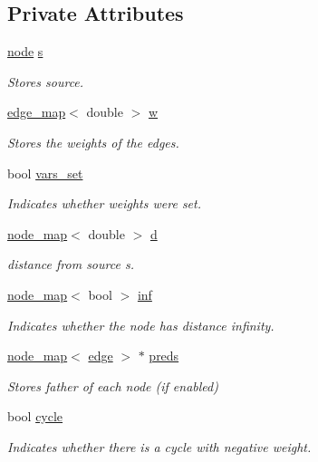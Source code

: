 \subsection*{Private Attributes}
\begin{DoxyCompactItemize}
\item 
\mbox{\hyperlink{classnode}{node}} \mbox{\hyperlink{classbellman__ford_a2d6ce715e65b26822c622b322811c3b0}{s}}
\begin{DoxyCompactList}\small\item\em Stores source. \end{DoxyCompactList}\item 
\mbox{\hyperlink{classedge__map}{edge\+\_\+map}}$<$ double $>$ \mbox{\hyperlink{classbellman__ford_ae05c9a40c2257f1e1f333b6a4f6fa656}{w}}
\begin{DoxyCompactList}\small\item\em Stores the weights of the edges. \end{DoxyCompactList}\item 
bool \mbox{\hyperlink{classbellman__ford_a0b727de83366d019041694f890f19dbb}{vars\+\_\+set}}
\begin{DoxyCompactList}\small\item\em Indicates whether weights were set. \end{DoxyCompactList}\item 
\mbox{\hyperlink{classnode__map}{node\+\_\+map}}$<$ double $>$ \mbox{\hyperlink{classbellman__ford_a0e3b99854a3f998f8ef6cde6fb902040}{d}}
\begin{DoxyCompactList}\small\item\em distance from source s. \end{DoxyCompactList}\item 
\mbox{\hyperlink{classnode__map}{node\+\_\+map}}$<$ bool $>$ \mbox{\hyperlink{classbellman__ford_a5c69a3ac59077a7a7e4b0484e5f85a32}{inf}}
\begin{DoxyCompactList}\small\item\em Indicates whether the node has distance infinity. \end{DoxyCompactList}\item 
\mbox{\hyperlink{classnode__map}{node\+\_\+map}}$<$ \mbox{\hyperlink{classedge}{edge}} $>$ $\ast$ \mbox{\hyperlink{classbellman__ford_a1ce37529c697ec5b89e8dc09204e4f59}{preds}}
\begin{DoxyCompactList}\small\item\em Stores father of each node (if enabled) \end{DoxyCompactList}\item 
bool \mbox{\hyperlink{classbellman__ford_aa2168afff14546b2fd99d2b52681156b}{cycle}}
\begin{DoxyCompactList}\small\item\em Indicates whether there is a cycle with negative weight. \end{DoxyCompactList}\end{DoxyCompactItemize}



